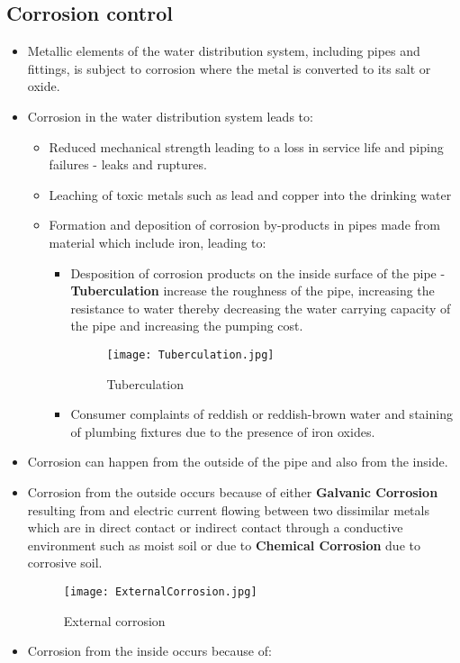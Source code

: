\subsection{Corrosion control} 
\begin{itemize}
\item Metallic elements of the water distribution system, including pipes and fittings, is subject to corrosion where the metal is converted to its salt or oxide.
\item Corrosion in the water distribution system leads to:

\begin{itemize}
\item Reduced mechanical strength leading to a loss in service life and piping failures - leaks and ruptures.
\item Leaching of toxic metals such as lead and copper into the drinking water
\item Formation and deposition of corrosion by-products in pipes made from material which include iron, leading to:

\begin{itemize}
\item Desposition of corrosion products on the inside surface of the pipe - \textbf{Tuberculation}   increase the roughness of the pipe, increasing the resistance to water thereby decreasing the water carrying capacity of the pipe and increasing the pumping cost.
\begin{figure}[h]
			      	\begin{center}
			      		\texttt{[image: Tuberculation.jpg]}\\
			      		\caption{Tuberculation}
			      	\end{center}
\end{figure}
\item  Consumer complaints of reddish or reddish-brown water and staining of plumbing fixtures due to the presence of iron oxides.
\end{itemize}

\end{itemize}

\item Corrosion can happen from the outside of the pipe and also from the inside.
\item Corrosion from the outside occurs because of either \textbf{Galvanic Corrosion}  resulting from and electric current flowing between two dissimilar metals which are in direct contact or indirect contact through a conductive environment such as moist soil or due to \textbf{Chemical Corrosion} due to corrosive soil.
\begin{figure}[H]
			      	\begin{center}
			      		\texttt{[image: ExternalCorrosion.jpg]}\\
			      		\caption{External corrosion}
			      	\end{center}
\end{figure} 
\item Corrosion from the inside occurs because of:



\end{itemize}
